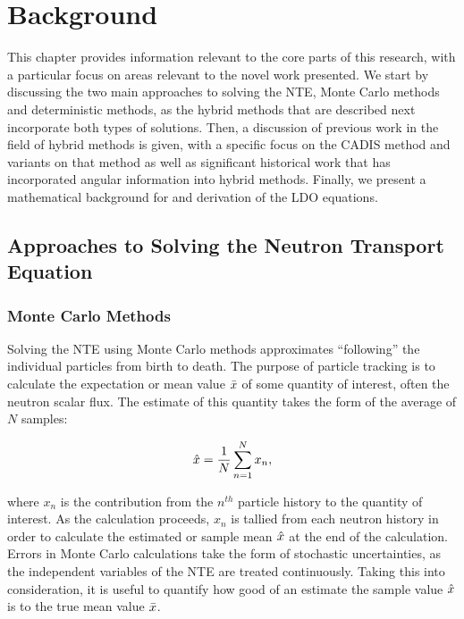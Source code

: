 \chapter{Background}
\label{bgch}

This chapter provides information relevant to the core parts of this research, with 
a particular focus on areas relevant to the novel work presented. We start by 
discussing the two main approaches to solving the NTE, Monte Carlo methods and 
deterministic methods, as the hybrid methods that are described next incorporate both
types of solutions. Then, a discussion of previous work in the field of hybrid methods
is given, with a specific focus on the CADIS method and variants on that method as
well as significant historical work that has incorporated angular information into
hybrid methods. Finally, we present a mathematical background for and derivation of 
the LDO equations.

\section{Approaches to Solving the Neutron Transport Equation}

\subsection{Monte Carlo Methods}

Solving the NTE using Monte Carlo methods approximates ``following'' the individual
particles from birth to death. The purpose of particle tracking is to calculate the
expectation or mean value $\bar{x}$ of some quantity of interest, often the neutron 
scalar flux. The estimate of this quantity takes the form of the average of $N$ 
samples:

\begin{equation}
\hat{x} = \frac{1}{N}\sum_{n=1}^{N}x_n,
\end{equation}

\noindent where $x_n$ is the contribution from the $n^{th}$ particle history to the
quantity of interest.
As the calculation proceeds, $x_n$ is tallied from each neutron history in order 
to calculate the estimated or sample mean $\hat{x}$ at the end of the calculation.
Errors in Monte Carlo calculations take the form of stochastic uncertainties, as the 
independent variables of the NTE are treated continuously. Taking this into
consideration, it is useful to quantify how good of an estimate the sample value
$\hat{x}$ is to the true mean value $\bar{x}$.


